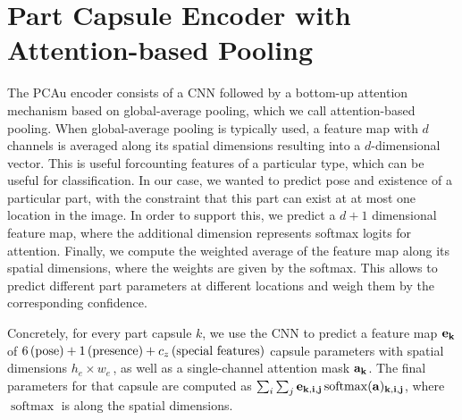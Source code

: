 \section{Part Capsule Encoder with Attention-based Pooling}
\label{app:attention_based_pooling}

The \gls{PCAu} encoder consists of a \gls{CNN} followed by a bottom-up attention mechanism based on global-average pooling, which we call attention-based pooling. 
When global-average pooling is typically used, a feature map with $d$ channels is averaged along its spatial dimensions resulting into a $d$-dimensional vector.
This is useful for\eg counting features of a particular type, which can be useful for classification.
In our case, we wanted to predict pose and existence of a particular part, with the constraint that this part can exist at at most one location in the image.
In order to support this, we predict a $d+1$ dimensional feature map, where the additional dimension represents softmax logits for attention.
Finally, we compute the weighted average of the feature map along its spatial dimensions, where the weights are given by the softmax.
This allows to predict different part parameters at different locations and weigh them by the corresponding confidence.

Concretely, for every part capsule $k$, we use the \gls{CNN} to predict a feature map $\bf{e}_k$ of $6 \text{\,(pose)} + 1 \text{\,(presence)} + c_z \text{\,(special features)}$ capsule parameters with spatial dimensions $h_e \times w_e$\,, as well as a single-channel attention mask $\bf{a}_k$.
The final parameters for that capsule are computed as $\sum_{i} \sum_j \bf{e}_{k, i,j} \operatorname{softmax}(\bf{a})_{k,i,j}$, where $\operatorname{softmax}$ is along the spatial dimensions.